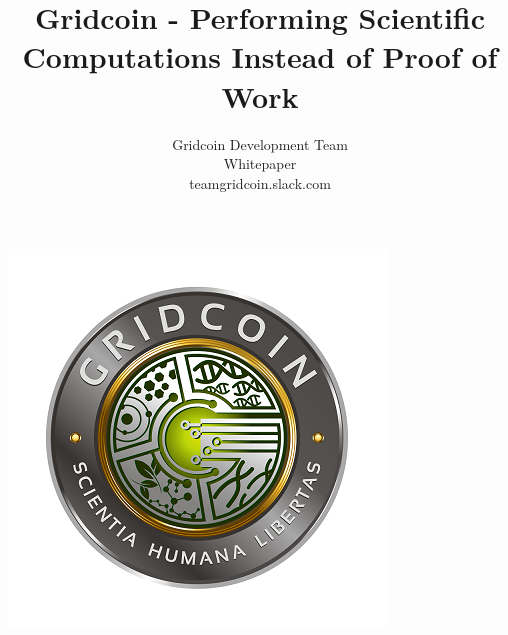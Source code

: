 \documentclass[10pt,a4paper]{article}
\begin{document}
\pagestyle{headings}




\title{Gridcoin - Performing Scientific Computations Instead of Proof of Work}

\author{Gridcoin Development Team\\
Whitepaper\\
teamgridcoin.slack.com\\}


\maketitle
\thispagestyle{empty}



\begin{center}
\includegraphics{figures/gridcoin-art-small}
\end{center}

















\newpage




\end{document}

